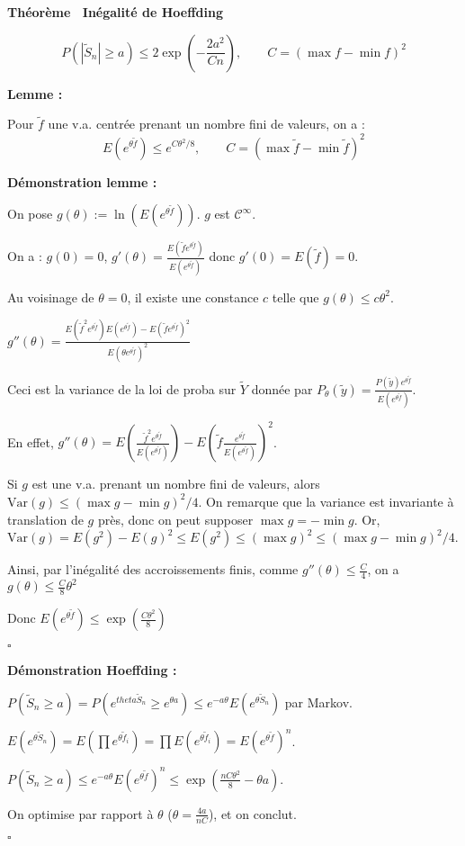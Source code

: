 \documentclass[10pt,a4paper,notitlepage ]{report}
\newcommand{\var}{\mathrm{Var}}
\newcounter{th}
\newenvironment{theorem}[1][]{
\refstepcounter{th}
\begin{tcolorbox}
	\textbf{Théorème \theth \ #1}
	
	
}{\end{tcolorbox}}
\newenvironment{demo}[1][]{

	\textbf{Démonstration #1 :}
}{\begin{flushright}
	$\square$
\end{flushright}
}
\newenvironment{lemme}[1][]{
	\begin{tcolorbox}
		\textbf{Lemme #1 : }
	}
	{\end{tcolorbox}}
\begin{document}
\begin{theorem}[Inégalité de Hoeffding]
	\[ P\left( \left| \tilde S_n \right| \ge a \right) \le 2 \exp (-\frac{2a^2}{Cn}), \qquad C = (\max f - \min f)^2\]
\end{theorem}

\begin{lemme}
	Pour $\tilde f$ une v.a. centrée prenant un nombre fini de valeurs, on a : 
	\[ E\left( e^{\theta \tilde f} \right) \le e^{C\theta^2/8}, \qquad C=(\max \tilde f - \min \tilde f)^2\]
\end{lemme}

\begin{demo}[lemme]
	On pose $g(\theta):=\ln(E(e^{\theta\tilde f}))$. $g$ est $\mathcal C^\infty$.
	
	On a : $g(0) = 0$, $g'(\theta) = \frac{E(\tilde f e^{\theta\tilde f})}{E(e^{\theta \tilde f})}$ donc $g'(0) = E(\tilde f) = 0$.
	
	Au voisinage de $\theta = 0$, il existe une constance $c$ telle que $g(\theta) \le c\theta^2$.
	
	$g''(\theta) = \frac{E(\tilde f^2 e^{\theta \tilde f}) E(e^{\theta\tilde f}) - E(\tilde f e^{\theta\tilde f})^2} {E(\theta e^{\theta\tilde f})^2}$
	
	Ceci est la variance de la loi de proba sur $\tilde Y$ donnée par $P_\theta(\tilde y) = \frac{P(\tilde y)e^{\theta\tilde f}}{E(e^{\theta \tilde f})}$.
	
	En effet, $g''(\theta) = E \left(  \frac{\tilde f^2 e^{\theta\tilde f}} {E(e^{\theta \tilde f})} \right) - E \left( \tilde f \frac{e^{\theta\tilde f}}{E(e^{\theta\tilde f})} \right)^2$.
	
	Si $g$ est une v.a. prenant un nombre fini de valeurs, alors $\var(g) \le (\max g - \min g)^2/4$. On remarque que la variance est invariante à translation de $g$ près, donc on peut supposer $\max g = - \min g$. Or, $\var(g) = E(g^2) - E(g)^2 \le E(g^2) \le (\max g)^2 \le (\max g - \min g)^2/4$.
	
	Ainsi, par l'inégalité des accroissements finis, comme $g''(\theta) \le \frac C 4$, on a $g(\theta) \le \frac C 8 \theta^2$
	
	Donc $E(e^{\theta\tilde f}) \le \exp\left( \frac{C\theta^2} 8 \right)$
\end{demo}

\begin{demo}[Hoeffding]
	$P(\tilde S_n \ge a) = P(e^{theta\tilde S_n} \ge e^{\theta a}) \le e^{-a\theta}E(e^{\theta\tilde S_n})$ par Markov.
	
	$E(e^{\theta\tilde S_n}) = E(\prod e^{\theta\tilde f_i}) = \prod E(e^{\theta\tilde f_i}) = E(e^{\theta\tilde f})^n$.
	
	$P(\tilde S_n \ge a) \le e^{-a\theta} E(e^{\theta\tilde f})^n \le \exp \left(\frac {nC\theta^2} 8 - \theta a \right)$.
	
	On optimise par rapport à $\theta$ ($\theta = \frac{4a}{nC}$), et on conclut.
\end{demo}
\end{document}
